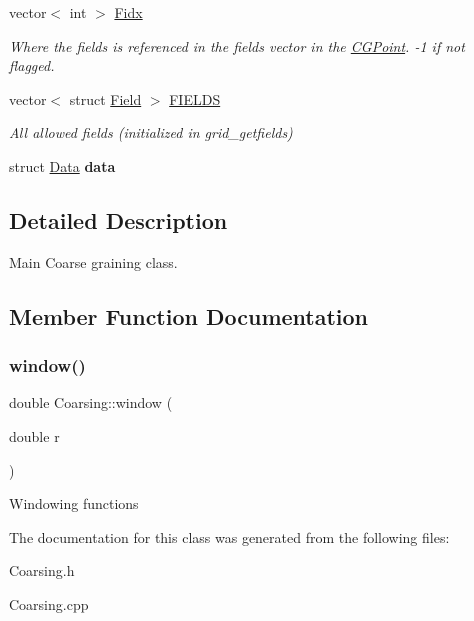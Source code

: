 \begin{DoxyCompactItemize}
\mbox{\label{classCoarsing_a07ec285bd11033d10f7a27a38bd5fd62}} 
vector$<$ int $>$ \hyperlink{classCoarsing_a07ec285bd11033d10f7a27a38bd5fd62}{Fidx}
\begin{DoxyCompactList}\small\item\em Where the fields is referenced in the fields vector in the \hyperlink{classCGPoint}{C\+G\+Point}. -\/1 if not flagged. \end{DoxyCompactList}\item 
\mbox{\label{classCoarsing_a56e5de2d000122cd6054017025e9634b}} 
vector$<$ struct \hyperlink{structField}{Field} $>$ \hyperlink{classCoarsing_a56e5de2d000122cd6054017025e9634b}{F\+I\+E\+L\+DS}
\begin{DoxyCompactList}\small\item\em All allowed fields (initialized in grid\+\_\+getfields) \end{DoxyCompactList}\item 
\mbox{\label{classCoarsing_a884bf9b4d9d9f5ae124c13cb353540f3}} 
struct \hyperlink{structData}{Data} {\bfseries data}
\end{DoxyCompactItemize}


\subsection{Detailed Description}
Main Coarse graining class. 

\subsection{Member Function Documentation}
\mbox{\label{classCoarsing_ae58a2ff869a21d6590983c47f45c302f}} 
\subsubsection{\texorpdfstring{window()}{window()}}
{\footnotesize\ttfamily double Coarsing\+::window (\begin{DoxyParamCaption}\item[{double}]{r }\end{DoxyParamCaption})\hspace{0.3cm}{\ttfamily [inline]}}

Windowing functions 

The documentation for this class was generated from the following files\+:\begin{DoxyCompactItemize}
\item 
Coarsing.\+h\item 
Coarsing.\+cpp\end{DoxyCompactItemize}
